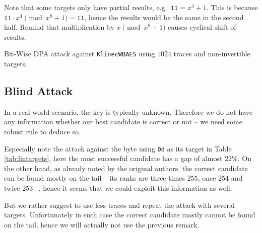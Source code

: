 Note that some targets only have partial results, e.g.\ $\texttt{11} = x^4+1$. This is because $\texttt{11}\cdot x^4 \pmod{x^8+1} = \texttt{11}$, hence the results would be the same in the second half. Remind that multiplication by $x\pmod{x^8+1}$ causes cyclical shift of results.

\begin{landscape}
\begin{table}[H]
	\begin{center}
	
	\end{center}
\caption{Bit-Wise DPA attack against {\tt KlinecWBAES} using $1024$ traces and non-invertible targets.}
\label{tab:noninvtargets}
\end{table}
\end{landscape}



\subsection{Blind Attack}

In a real-world scenario, the key is typically unknown. Therefore we do not have any information whether our best candidate is correct or not -- we need some robust rule to deduce so.

\begin{remark}
\label{rem:tail}
	Especially note the attack against the  byte using {\tt 0d} as its target in Table \ref{tab:lintargets}, here the most successful candidate has a gap of almost $22\%$. On the other hand, as already noted by the original authors, the correct candidate can be found mostly on the tail -- its ranks are three times $255$, once $254$ and twice $253$ --, hence it seems that we could exploit this information as well.
\end{remark}

But we rather suggest to use less traces and repeat the attack with several targets. Unfortunately in such case the correct candidate mostly cannot be found on the tail, hence we will actually not use the previous remark. %

